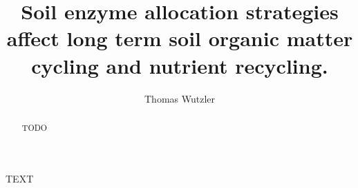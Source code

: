\documentclass[SOIL]{copernicus}
\begin{document}
\linenumbers

\title{Soil enzyme allocation strategies affect long term soil organic matter cycling and nutrient recycling.}

\author[1]{Thomas Wutzler}










\received{}
\pubdiscuss{} %
\revised{}
\accepted{}
\published{}




\maketitle  %



\begin{abstract}
TODO
\end{abstract}









\appendix







\begin{acknowledgements}
TEXT
\end{acknowledgements}





%
%
 


\end{document}
